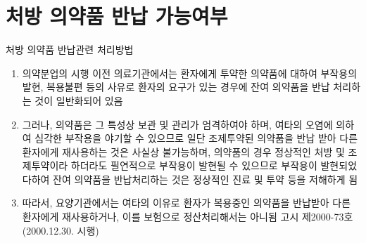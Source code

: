 ﻿\section{처방 의약품 반납 가능여부}

\begin{commentbox}{처방 의약품 반납관련 처리방법}
\begin{enumerate}[1.]\tightlist
\item 의약분업의 시행 이전 의료기관에서는 환자에게 투약한 의약품에 대하여 부작용의 발현, 복용불편 등의 사유로 환자의 요구가 있는 경우에 잔여 의약품을 반납 처리하는 것이 일반화되어 있음
\item 그러나, 의약품은 그 특성상 보관 및 관리가 엄격하여야 하며, 여타의 오염에 의하여 심각한 부작용을 야기할 수 있으므로 일단 조제\cntrdot{}투약된 의약품을 반납 받아 다른 환자에게 재사용하는 것은 사실상 불가능하며, 의약품의 경우 정상적인 처방 및 조제\cntrdot{}투약이라 하더라도 필연적으로 부작용이 발현될 수 있으므로 부작용이 발현되었다하여 잔여 의약품을 반납처리하는 것은 정상적인 진료 및 투약 등을 저해하게 됨
\item 따라서, 요양기관에서는 여타의 이유로 환자가 복용중인 의약품을 반납받아 다른 환자에게 재사용하거나, 이를 보험으로 정산처리해서는 아니됨 고시 제2000-73호 (2000.12.30. 시행)
\end{enumerate}
\end{commentbox}
